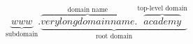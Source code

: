 \begin{align*}
    \underbrace{www}_\text{subdomain}
    \text{.}
    \underbrace{
        \overbrace{verylongdomainname}^\text{domain name}
        \text{.}
        \overbrace{academy}^\text{top-level domain}
    }_\text{root domain}
\end{align*}